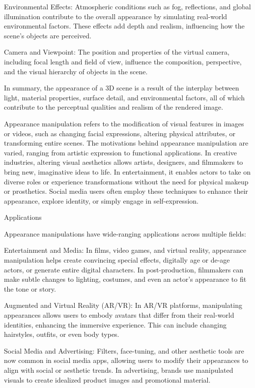 Environmental Effects: Atmospheric conditions such as fog, reflections, and global illumination contribute to the overall appearance by simulating real-world environmental factors. These effects add depth and realism, influencing how the scene's objects are perceived.

Camera and Viewpoint: The position and properties of the virtual camera, including focal length and field of view, influence the composition, perspective, and the visual hierarchy of objects in the scene.

In summary, the appearance of a 3D scene is a result of the interplay between light, material properties, surface detail, and environmental factors, all of which contribute to the perceptual qualities and realism of the rendered image.



Appearance manipulation refers to the modification of visual features in images or videos, such as changing facial expressions, altering physical attributes, or transforming entire scenes. The motivations behind appearance manipulation are varied, ranging from artistic expression to functional applications. In creative industries, altering visual aesthetics allows artists, designers, and filmmakers to bring new, imaginative ideas to life. In entertainment, it enables actors to take on diverse roles or experience transformations without the need for physical makeup or prosthetics. Social media users often employ these techniques to enhance their appearance, explore identity, or simply engage in self-expression.

Applications

Appearance manipulations have wide-ranging applications across multiple fields:

Entertainment and Media: In films, video games, and virtual reality, appearance manipulation helps create convincing special effects, digitally age or de-age actors, or generate entire digital characters. In post-production, filmmakers can make subtle changes to lighting, costumes, and even an actor’s appearance to fit the tone or story.

Augmented and Virtual Reality (AR/VR): In AR/VR platforms, manipulating appearances allows users to embody avatars that differ from their real-world identities, enhancing the immersive experience. This can include changing hairstyles, outfits, or even body types.

Social Media and Advertising: Filters, face-tuning, and other aesthetic tools are now common in social media apps, allowing users to modify their appearances to align with social or aesthetic trends. In advertising, brands use manipulated visuals to create idealized product images and promotional material.

